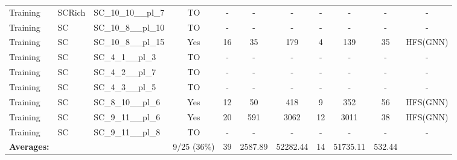 \documentclass{article}
\begin{document}
\begin{tabular}{lllcccccccc}
Training & SCRich & SC\_10\_10\_\_pl\_7 & TO & - & - & - & - & - & - & - \\
Training & SC & SC\_10\_8\_\_pl\_10 & TO & - & - & - & - & - & - & - \\
Training & SC & SC\_10\_8\_\_pl\_15 & Yes & 16 & 35 & 179 & 4 & 139 & 35 & HFS(GNN) \\
Training & SC & SC\_4\_1\_\_pl\_3 & TO & - & - & - & - & - & - & - \\
Training & SC & SC\_4\_2\_\_pl\_7 & TO & - & - & - & - & - & - & - \\
Training & SC & SC\_4\_3\_\_pl\_5 & TO & - & - & - & - & - & - & - \\
Training & SC & SC\_8\_10\_\_pl\_6 & Yes & 12 & 50 & 418 & 9 & 352 & 56 & HFS(GNN) \\
Training & SC & SC\_9\_11\_\_pl\_6 & Yes & 20 & 591 & 3062 & 12 & 3011 & 38 & HFS(GNN) \\
Training & SC & SC\_9\_11\_\_pl\_8 & TO & - & - & - & - & - & - & - \\
\textbf{Averages:} & & & 9/25 (36\%) & 39 & 2587.89 & 52282.44 & 14 & 51735.11 & 532.44 & \\
\bottomrule
\end{tabular}
\newpage
\end{document}
